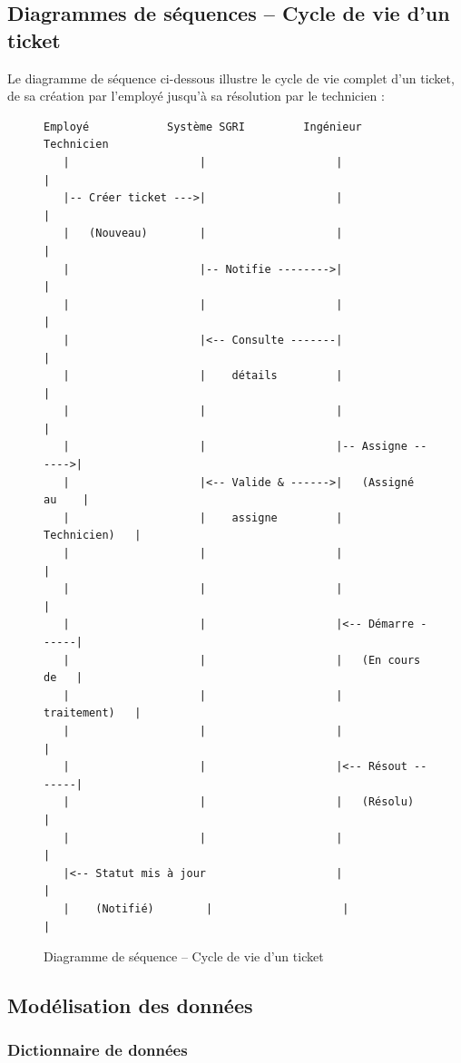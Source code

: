 \documentclass[12pt,a4paper,twoside]{report}
\begin{document}
\subsection{Diagrammes de séquences -- Cycle de vie d'un ticket}

Le diagramme de séquence ci-dessous illustre le cycle de vie complet d'un ticket, de sa création par l'employé jusqu'à sa résolution par le technicien :

\begin{figure}[H]
    \centering
    \caption{Diagramme de séquence -- Cycle de vie d'un ticket}
    \label{fig:sequence}
    \begin{verbatim}
Employé            Système SGRI         Ingénieur         Technicien
   |                    |                    |                  |
   |-- Créer ticket --->|                    |                  |
   |   (Nouveau)        |                    |                  |
   |                    |-- Notifie -------->|                  |
   |                    |                    |                  |
   |                    |<-- Consulte -------|                  |
   |                    |    détails         |                  |
   |                    |                    |                  |
   |                    |                    |-- Assigne ------>|
   |                    |<-- Valide & ------>|   (Assigné au    |
   |                    |    assigne         |    Technicien)   |
   |                    |                    |                  |
   |                    |                    |                  |
   |                    |                    |<-- Démarre ------|
   |                    |                    |   (En cours de   |
   |                    |                    |    traitement)   |
   |                    |                    |                  |
   |                    |                    |<-- Résout -------|
   |                    |                    |   (Résolu)       |
   |                    |                    |                  |
   |<-- Statut mis à jour                    |                  |
   |    (Notifié)        |                    |                  |
    \end{verbatim}
\end{figure}

\subsection{Modélisation des données}

\subsubsection{Dictionnaire de données}
\end{document}
